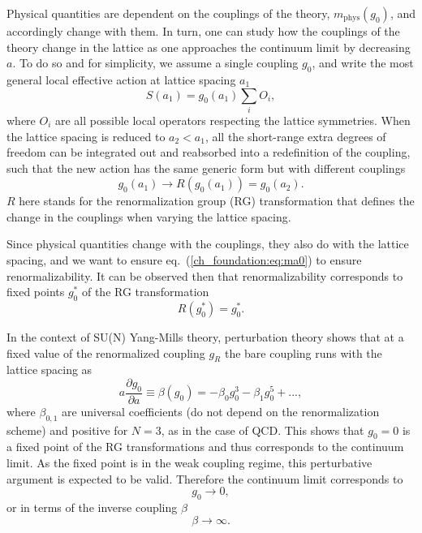 Physical quantities are dependent on the couplings of the theory, $m_{\textrm{phys}}(g_0)$, and accordingly change with them. In turn, one can study how the couplings of the theory change in the lattice as one approaches the continuum limit by decreasing $a$. To do so and for simplicity, we assume a single coupling $g_0$, and write the most general local effective action at lattice spacing $a_1$
\begin{equation}
S(a_1)=g_0(a_1)\sum_i{O}_i,
\end{equation}
where ${O}_i$ are all possible local operators respecting the lattice symmetries. When the lattice spacing is reduced to $a_2<a_1$, all the short-range extra degrees of freedom can be integrated out and reabsorbed into a redefinition of the coupling, such that the new action has the same generic form but with different couplings
\begin{equation}
g_0(a_1)\rightarrow R(g_0(a_1))=g_0(a_2).
\end{equation}
$R$ here stands for the renormalization group (RG) transformation that defines the change in the couplings when varying the lattice spacing.

Since physical quantities change with the couplings, they also do with the lattice spacing, and we want to ensure eq.~(\ref{ch_foundation:eq:ma0}) to ensure renormalizability. It can be observed then that renormalizability corresponds to fixed points $g_0^*$ of the RG transformation
\begin{equation}
R(g_0^*)=g_0^*.
\end{equation}

In the context of SU(N) Yang-Mills theory, perturbation theory shows that at a fixed value of the renormalized coupling $g_R$ the bare coupling runs with the lattice spacing as
\begin{equation}
\label{ch_foundation:eq:beta-func}
a\frac{\partial g_0}{\partial a}\equiv\beta(g_0)=-\beta_0g_0^3-\beta_1g_0^5+...,
\end{equation}
where $\beta_{0,1}$ are universal coefficients (do not depend on the renormalization scheme) and positive for $N=3$, as in the case of QCD. This shows that $g_0=0$ is a fixed point of the RG transformations and thus corresponds to the continuum limit. As the fixed point is in the weak coupling regime, this perturbative argument is expected to be valid. Therefore the continuum limit corresponds to
\begin{equation}
g_0\rightarrow0,
\end{equation}
or in terms of the inverse coupling $\beta$
\begin{equation}
\beta\rightarrow\infty.
\end{equation}

